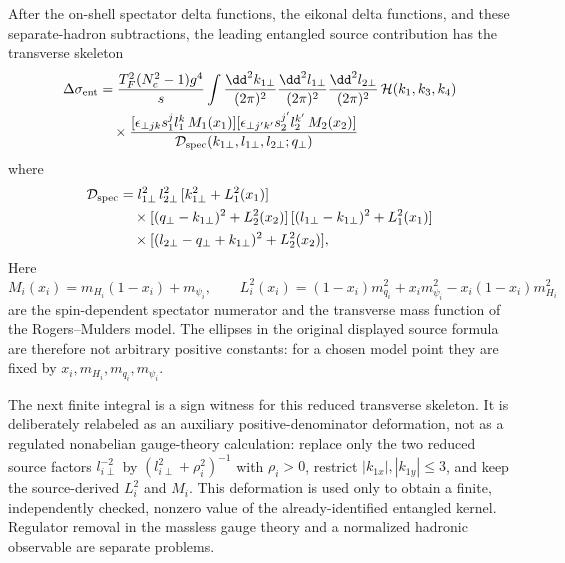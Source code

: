 \begin{controlledapproximation}
After the on-shell spectator delta functions, the eikonal delta functions,
and these separate-hadron subtractions, the leading entangled source
contribution has the transverse skeleton
\begin{equation}
\begin{aligned}
  \Delta\sigma_{\rm ent}
  &=
  \frac{T_F^2(N_c^2-1)g^4}{s}
  \int
  \frac{\dd^2 k_{1\perp}}{(2\pi)^2}
  \frac{\dd^2 l_{1\perp}}{(2\pi)^2}
  \frac{\dd^2 l_{2\perp}}{(2\pi)^2}\,
  \mathcal H(k_1,k_3,k_4)
\\
  &\quad\times
  \frac{
  [\epsilon_{\perp jk}s_1^j l_1^k\,M_1(x_1)]
  [\epsilon_{\perp j'k'}s_2^{j'}l_2^{k'}\,M_2(x_2)]
  }{\mathcal D_{\rm spec}(k_{1\perp},l_{1\perp},l_{2\perp};q_\perp)}
\end{aligned}
  \label{eq:scet-spectator-entangled-breaking-integral}
\end{equation}
where
\[
\begin{aligned}
  \mathcal D_{\rm spec}
  &=
  l_{1\perp}^2\,
  l_{2\perp}^2\,
  [k_{1\perp}^2+L_1^2(x_1)]
\\
  &\quad\times
  [(q_\perp-k_{1\perp})^2+L_2^2(x_2)]\,
  [(l_{1\perp}-k_{1\perp})^2+L_1^2(x_1)]
\\
  &\quad\times
  [(l_{2\perp}-q_\perp+k_{1\perp})^2+L_2^2(x_2)] ,
\end{aligned}
\]
Here
\[
  M_i(x_i)=m_{H_i}(1-x_i)+m_{\psi_i},\qquad
  L_i^2(x_i)
  =
  (1-x_i)m_{q_i}^2+x_i m_{\psi_i}^2
  -x_i(1-x_i)m_{H_i}^2
\]
are the spin-dependent spectator numerator and the transverse mass function
of the Rogers--Mulders model.  The ellipses in the original displayed source
formula are therefore not arbitrary positive constants: for a chosen model
point they are fixed by \(x_i,m_{H_i},m_{q_i},m_{\psi_i}\).

The next finite integral is a sign witness for this reduced transverse
skeleton.  It is deliberately relabeled as an auxiliary positive-denominator
deformation, not as a regulated nonabelian gauge-theory calculation: replace
only the two reduced source factors \(l_{i\perp}^{-2}\) by
\((l_{i\perp}^2+\rho_i^2)^{-1}\) with \(\rho_i>0\), restrict
\(|k_{1x}|,|k_{1y}|\le3\), and keep the source-derived \(L_i^2\) and
\(M_i\).  This deformation is used only to obtain a finite, independently
checked, nonzero value of the already-identified entangled kernel.  Regulator
removal in the massless gauge theory and a normalized hadronic observable are
separate problems.


\end{controlledapproximation}
